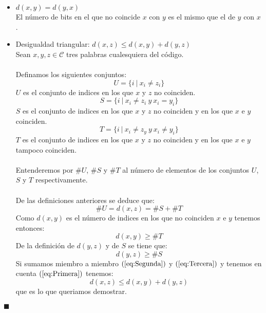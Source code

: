 \begin{itemize}
La distancia entre dos palabras ser\'a cero s\'{\i} y s\'olo s\'{\i} coinciden
en todos sus bits, luego ambas palabras ser\'an las mismas.
\item $d(x,y)=d(y,x)$ \\
El n\'umero de bits en el que no coincide $x$ con $y$ es el mismo que el de $y$
con $x$.
\item Desigualdad triangular: $d(x,z)\leq d(x,y)+d(y,z)$\\
Sean $x,y,z\in \mathcal{C}$ tres palabras cualesquiera del c\'odigo.\\ \\
%
Definamos los siguientes conjuntos:
\begin{displaymath}
U=\{i\ |\ x_i\neq z_i \}
\end{displaymath}
$U$ es el conjunto de indices en los que $x$ y $z$ no coinciden.
\begin{displaymath}
S=\{i\ |\ x_i\neq z_i\ y\ x_i=y_i \}
\end{displaymath}
$S$ es el conjunto de indices en los que $x$ y $z$ no coinciden y en los que
$x$ e $y$ coinciden.
\begin{displaymath}
T=\{i\ |\ x_i\neq z_y\ y\ x_i\neq y_i\}
\end{displaymath}
$T$ es el conjunto de indices en los que $x$ y $z$ no coinciden y en los que
$x$ e $y$ tampoco coinciden.\\ \\
%
Entenderemos por $\#U$, $\#S$ y $\#T$ al n\'umero de elementos de los conjuntos
$U$, $S$ y $T$ respectivamente.\\ \\
%
De las definiciones anteriores se deduce que:
\begin{equation}\label{eq:Primera}
\#U=d(x,z)=\#S+\#T
\end{equation}
Como $d(x,y)$ es el n\'umero de indices en los que no coinciden $x$ e $y$
tenemos entonces:
\begin{equation}\label{eq:Segunda}
d(x,y)\geq \#T
\end{equation}
De la definici\'on de $d(y,z)$ y de $S$ se tiene que:
\begin{equation}\label{eq:Tercera}
d(y,z)\geq \#S
\end{equation}
Si sumamos miembro a miembro $(\ref{eq:Segunda})$ y $(\ref{eq:Tercera})$ y
tenemos en cuenta $(\ref{eq:Primera})$ tenemos: $$d(x,z)\leq d(x,y)+d(y,z)$$
que es lo que queriamos demostrar.
\end{itemize}
\begin{flushright}
$\blacksquare$
\end{flushright}

